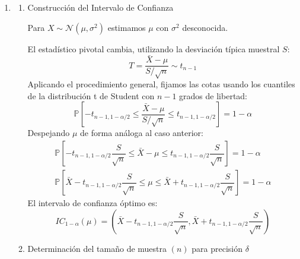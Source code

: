 \begin{enumerate}[label=\color{red}\textbf{\arabic*)}]
\begin{enumerate}[label=\color{red}\textbf{\alph*)}]
\begin{enumerate}[label=\arabic*)]
			                  Establecemos la inecuación donde el margen de error debe ser menor o igual a la precisión máxima $\delta$: \[
				                  z_{1-\alpha / 2} \dfrac{\sigma}{\sqrt{n} }\le \delta
			                  \]
			                  Despejamos $n$: \[
				                  \begin{array}{c}
					                  \sqrt{n}\ge \dfrac{z_{1-\alpha / 2}\sigma}{\delta} \\
					                  n\ge \left( \dfrac{z_{1-\alpha / 2}\sigma}{\delta} \right)^2
				                  \end{array}
			                  \]
		            \end{enumerate}
		      \item {}
		            \begin{enumerate}[label=\arabic*)]
			            \item Construcción del Intervalo de Confianza

			                  Para $X\sim \mathcal{N}(\mu,\sigma^2)$ estimamos $\mu$ con $\sigma^2$ desconocida.

			                  El estadístico pivotal cambia, utilizando la desviación típica muestral $S$: \[
				                  T=\dfrac{\bar{X}-\mu}{S / \sqrt{n} }\sim t_{n-1}
			                  \]
			                  Aplicando el procedimiento general, fijamos las cotas usando los cuantiles de la distribución t de Student con $n-1$ grados de libertad: \[
				                  \mathbb{P}\left[ -t_{n-1,1-\alpha / 2}\le \dfrac{\bar{X}-\mu}{S / \sqrt{n} }\le t_{n-1,1-\alpha / 2} \right] =1-\alpha
			                  \]
			                  Despejando $\mu$ de forma análoga al caso anterior: \[
				                  \begin{array}{c}
					                  \mathbb{P}\left[ -t_{n-1,1-\alpha / 2} \dfrac{S}{\sqrt{n} } \le \bar{X} -\mu\le t_{n-1,1-\alpha / 2} \dfrac{S}{\sqrt{n} }\right] =1-\alpha \\
					                  \mathbb{P}\left[ \bar{X}-t_{n-1,1-\alpha / 2} \dfrac{S}{\sqrt{n} }\le \mu\le \bar{X}+t_{n-1,1-\alpha / 2} \dfrac{S}{\sqrt{n} } \right] =1-\alpha
				                  \end{array}
			                  \]
			                  El intervalo de confianza óptimo es: \[
				                  IC_{1-\alpha}(\mu)=\left( \bar{X}-t_{n-1,1-\alpha / 2} \dfrac{S}{\sqrt{n} },\bar{X}+t_{n-1,1-\alpha / 2} \dfrac{S}{\sqrt{n} } \right)
			                  \]
			            \item Determinación del tamaño de muestra $(n)$ para precisión $\delta$


\end{enumerate}
\end{enumerate}
\end{enumerate}
